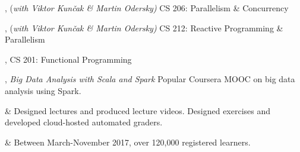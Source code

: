 \documentclass[9pt]{article}
\begin{document}
, {(\em with Viktor Kun\v cak \& Martin Odersky)} 
\newline\noindent CS 206: Parallelism \& Concurrency 
\bigskip

, {(\em with Viktor Kun\v cak \& Martin Odersky)} 
\newline\noindent CS 212: Reactive Programming \& Parallelism 
\bigskip

, 
\newline\noindent CS 201: Functional Programming 
\bigskip



\medskip
{}

, {\em Big Data Analysis with Scala and Spark} 
\newline\noindent Popular Coursera MOOC on big data analysis using Spark. 
\smallskip
\begin{easylist}[itemize]
& Designed lectures and produced lecture videos. Designed exercises
\newline and developed cloud-hosted automated graders.

& Between March-November 2017, over 120,000 registered learners.
\end{easylist}

%
\bigskip
\end{document}
